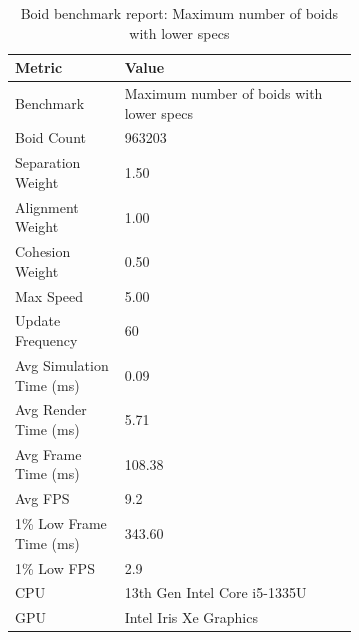 \documentclass[a4paper, 12pt]{article}
\begin{document}
\begin{table}[htbp]
\centering
{}
\begin{tabular}{l p{0.68\linewidth}}
\hline
Metric & Value \\
\hline
Benchmark & Maximum number of boids with lower specs \\
Boid Count & 963203 \\
Separation Weight & 1.50 \\
Alignment Weight & 1.00 \\
Cohesion Weight & 0.50 \\
Max Speed & 5.00 \\
Update Frequency & 60 \\
Avg Simulation Time (ms) & 0.09 \\
Avg Render Time (ms) & 5.71 \\
Avg Frame Time (ms) & 108.38 \\
Avg FPS & 9.2 \\
1\% Low Frame Time (ms) & 343.60 \\
1\% Low FPS & 2.9 \\
CPU & 13th Gen Intel Core i5-1335U \\
GPU & Intel Iris Xe Graphics \\
\hline
\end{tabular}
\caption{Boid benchmark report: Maximum number of boids with lower specs}
\label{tab:boid-benchmark-report-max-weak}
\end{table}
\end{document}
